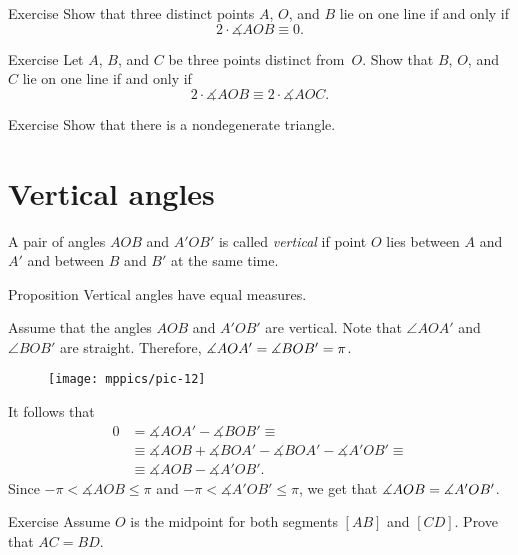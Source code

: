 \begin{thm}{Exercise}\label{ex:lineAOB}
Show that three distinct points $A$, $O$, and $B$ lie on one line if and only if 
$$2\cdot \measuredangle AOB\equiv 0.$$ 

\end{thm}

\begin{thm}{Exercise}\label{ex:ABCO-line}
Let $A$, $B$, and $C$ be three points distinct from~$O$.
Show that $B$, $O$, and $C$ lie on one line if and only if
$$2\cdot \measuredangle AOB\equiv 2\cdot \measuredangle AOC.$$ 

\end{thm}

\begin{thm}{Exercise}\label{ex:infinite-number-of-lines} 
Show that there is a nondegenerate triangle.
\end{thm}

\section{Vertical angles}

A pair of angles $AOB$ and $A'OB'$ 
is called \emph{vertical}
if point $O$ 
lies between $A$ and $A'$ 
and between $B$ and $B'$ at the same time.


\begin{thm}[\abs]{Proposition}\label{prop:vert}
Vertical angles have equal measures.
\end{thm}


Assume that the angles $AOB$ and $A'OB'$ are vertical.
Note that $\angle AOA'$ and $\angle BOB'$ are straight.
Therefore, $\measuredangle AOA'=\measuredangle BOB'=\pi$.

{

\begin{wrapfigure}[4]{o}{24mm}
\vskip-2mm
\centering
\texttt{[image: mppics/pic-12]}
\end{wrapfigure}

It follows that
\begin{align*}
0&=\measuredangle AOA'-\measuredangle BOB'\equiv
\\
&\equiv 
\measuredangle AOB+\measuredangle BOA'-\measuredangle BOA'-\measuredangle A'OB'
\equiv
\\
&\equiv\measuredangle AOB-\measuredangle A'OB'.
\end{align*}
Since $-\pi<\measuredangle AOB\le \pi$ and $-\pi<\measuredangle A'OB'\le \pi$, we get that $\measuredangle AOB=\measuredangle A'OB'$.
\qeds

}

\begin{thm}{Exercise}\label{ex:O-mid-AB+CD}
Assume $O$ 
is the midpoint for both segments 
$[A B]$ and $[C D]$.
Prove that $A C= B D$. 
\end{thm}
